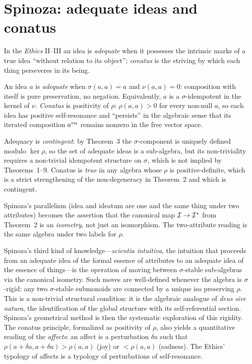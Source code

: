 \section{Spinoza: adequate ideas and conatus}\label{sec:spinoza}

 In the \emph{Ethics} II--III
\cite{Spinoza1677} an idea is \emph{adequate} when it possesses the
intrinsic marks of a true idea ``without relation to its object'';
\emph{conatus} is the striving by which each thing perseveres in its
being.

\formalclaim An idea $a$ is \emph{adequate} when $\sigma(a, a) = a$ and
$\nu(a,a) = 0$: composition with itself is pure preservation, no
negation. Equivalently, $a$ is a $\sigma$-idempotent in the kernel of
$\nu$. \emph{Conatus} is positivity of $\rho$: $\rho(a,a)>0$ for every
non-null $a$, so each idea has positive self-resonance and ``persists''
in the algebraic sense that its iterated composition $a^{\mathbin{\diamond} n}$
remains nonzero in the free vector space.

\formalstatus Adequacy is \emph{contingent}: by Theorem~3 the
$\sigma$-component is uniquely defined modulo $\ker\rho$, so the set of
adequate ideas is a sub-algebra, but its non-triviality requires a
non-trivial idempotent structure on $\sigma$, which is not implied by
Theorems~1--9. Conatus is \emph{true} in any algebra whose $\rho$ is
positive-definite, which is a strict strengthening of the non-degeneracy
in Theorem~2 and which is contingent.

\litcomment Spinoza's parallelism (idea and ideatum are one and the same
thing under two attributes) becomes the assertion that the canonical map
$\mathcal{I}\to\mathcal{I}^*$ from Theorem~2 is an \emph{isometry}, not just an
isomorphism. The two-attribute reading is the same algebra under two
labels for $\rho$.

Spinoza's third kind of knowledge---\emph{scientia intuitiva}, the
intuition that proceeds from an adequate idea of the formal essence of
attributes to an adequate idea of the essence of things---is the
operation of moving between $\sigma$-stable sub-algebras via the
canonical isometry. Such moves are well-defined whenever the algebra
is $\sigma$-rigid: any two $\sigma$-stable submonoids are connected by
a unique iso preserving $\rho$. This is a non-trivial structural
condition: it is the algebraic analogue of \emph{deus sive natura},
the identification of the global structure with its self-referential
section. Spinoza's geometrical method is then the systematic
exploration of this rigidity. The conatus principle, formalized as
positivity of $\rho$, also yields a quantitative reading of the
\emph{affects}: an affect is a perturbation $\delta a$ such that
$\rho(a + \delta a, a + \delta a) > \rho(a, a)$ (joy) or
$< \rho(a,a)$ (sadness). The Ethics' typology of affects is a typology
of perturbations of self-resonance.

